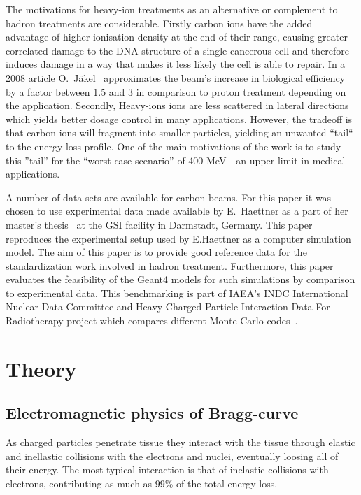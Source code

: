 The motivations for heavy-ion treatments as an alternative or complement to hadron treatments are considerable. Firstly carbon ions have the added advantage of higher ionisation-density at the end of their range, causing greater correlated damage to the DNA-structure of a single cancerous cell and therefore induces damage in a way that makes it less likely the cell is able to repair. In a 2008 article O.~Jäkel~\cite{ojakel} approximates the beam's increase in biological efficiency by a factor between 1.5 and 3 in comparison to proton treatment depending on the application. Secondly, Heavy-ions ions are less scattered in lateral directions which yields better dosage control in many applications. However, the tradeoff is that carbon-ions will fragment into smaller particles, yielding an unwanted ``tail`` to the energy-loss profile. One of the main motivations of the work is to study this ''tail'' for the ``worst case scenario'' of 400 MeV - an upper limit in medical applications.

A number of data-sets are available for carbon beams. For this paper it was chosen to use experimental data made available by E.~Haettner as a part of her master's thesis~\cite{ehaettner} at the GSI facility in Darmstadt, Germany. This paper reproduces the experimental setup used by E.Haettner as a computer simulation model. The aim of this paper is to provide good reference data for the standardization work involved in hadron treatment. Furthermore, this paper evaluates the feasibility of the Geant4 models for such simulations by comparison to experimental data. This benchmarking is part of IAEA's INDC International Nuclear Data Committee and Heavy Charged-Particle Interaction Data For Radiotherapy project which compares different Monte-Carlo codes~\cite{SummaryReport}.



\clearpage
\section{Theory}

\subsection{Electromagnetic physics of Bragg-curve}
As charged particles penetrate tissue they interact with the tissue through elastic and inellastic collisions with the electrons and nuclei, eventually loosing all of their energy. The most typical interaction is that of inelastic collisions with electrons, contributing as much as 99\% of the total energy loss.


